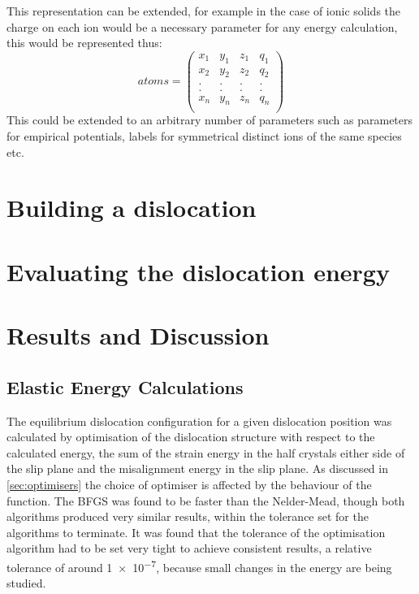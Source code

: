 This representation can be extended, for example in the case of ionic solids the charge on each ion would be a necessary parameter for any energy calculation, this would be represented thus:
$$
atoms = \begin{pmatrix}
x_1 & y_1 & z_1 & q_1 \\
x_2 & y_2 & z_2 & q_2 \\
.   &.    &.    &.    \\
.   &.    &.    &.    \\
x_n & y_n & z_n & q_n \\
\end{pmatrix}
$$
This could be extended to an arbitrary number of parameters such as parameters for empirical potentials, labels for symmetrical distinct ions of the same species etc.





\section{Building a dislocation}
\FloatBarrier
\label{sec:build}










\section{Evaluating the dislocation energy}
\label{sec:dislocation_energy}






\section{Results and Discussion}

\subsection{Elastic Energy Calculations}
\label{sec:elastic_results}

The equilibrium dislocation configuration for a given dislocation position was calculated by optimisation of the dislocation structure with respect to the calculated energy, the sum of the strain energy in the half crystals either side of the slip plane and the misalignment energy in the slip plane. As discussed in \autoref{sec:optimisers} the choice of optimiser is affected by the behaviour of the function. The BFGS was found to be faster than the Nelder-Mead, though both algorithms produced very similar results, within the tolerance set for the algorithms to terminate. It was found that the tolerance of the optimisation algorithm had to be set very tight to achieve consistent results, a relative tolerance of around \num{1e-7}, because small changes in the energy are being studied. 

